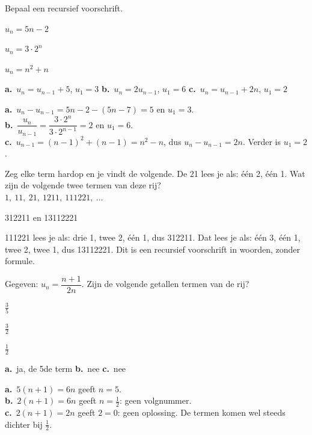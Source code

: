 \begin{oefeningen}
\begin{oefening}[2]\label{oef:h1-omzet}
Bepaal een recursief voorschrift.
\begin{reeks}
  \item $u_n = 5n - 2$
  \item $u_n = 3 \cdot 2^n$
  \item $u_n = n^2 + n$
\end{reeks}
\begin{solution}
\textbf{a.}~$u_n=u_{n-1}+5$, $u_1=3$ \quad \textbf{b.}~$u_n=2u_{n-1}$, $u_1=6$ \quad \textbf{c.}~$u_n=u_{n-1}+2n$, $u_1=2$
\end{solution}
\begin{fullsolution}
\textbf{a.}~$u_n-u_{n-1}=5n-2-(5n-7)=5$ en $u_1=3$.\\
\textbf{b.}~$\dfrac{u_n}{u_{n-1}}=\dfrac{3\cdot 2^n}{3\cdot 2^{n-1}}=2$ en $u_1=6$.\\
\textbf{c.}~$u_{n-1}=(n-1)^2+(n-1)=n^2-n$, dus $u_n-u_{n-1}=2n$. Verder is $u_1=2$.
\end{fullsolution}
\end{oefening}

\begin{oefening}[2]
Zeg elke term hardop en je vindt de volgende. De 21 lees je als: één 2, één 1. Wat zijn de volgende twee termen van deze rij?\\[.5ex]
$1,\ 11,\ 21,\ 1211,\ 111221,\ \ldots$
\begin{solution}
312211 en 13112221
\end{solution}
\begin{fullsolution}
111221 lees je als: drie 1, twee 2, één 1, dus 312211. Dat lees je als: één 3, één 1, twee 2, twee 1, dus 13112221. Dit is een recursief voorschrift in woorden, zonder formule.
\end{fullsolution}
\end{oefening}

\begin{oefening}[2]
Gegeven: $u_n = \dfrac{n+1}{2n}$. Zijn de volgende getallen termen van de rij?
\begin{reeks}
  \item $\tfrac35$
  \item $\tfrac32$
  \item $\tfrac12$
\end{reeks}
\begin{solution}
\textbf{a.}~ja, de 5de term \quad \textbf{b.}~nee \quad \textbf{c.}~nee
\end{solution}
\begin{fullsolution}
\textbf{a.}~$5(n+1)=6n$ geeft $n=5$.\\
\textbf{b.}~$2(n+1)=6n$ geeft $n=\tfrac12$: geen volgnummer.\\
\textbf{c.}~$2(n+1)=2n$ geeft $2=0$: geen oplossing. De termen komen wel steeds dichter bij $\tfrac12$.
\end{fullsolution}
\end{oefening}


\end{oefeningen}
